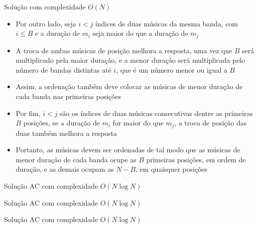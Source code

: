 \begin{frame}[fragile]{Solução com complexidade $O(N)$}

    \begin{itemize}
        \item Por outro lado, seja $i < j$ índices de duas músicas da mesma banda, com
            $i \leq B$ e a duração de $m_i$ seja maior do que a duração de $m_j$

        \item A troca de ambas músicas de posição melhora a resposta, uma vez que $B$ será
            multiplicado pela maior duração, e a menor duração será multiplicada pelo número de
            bandas distintas até $i$, que é um número menor ou igual a $B$

        \item Assim, a ordenação também deve colocar as músicas de menor duração de cada banda
            nas primeiras posições

        \item Por fim, $i < j$ são os índices de duas músicas consecutivas dentre as primeiras 
            $B$ posições, se a duração de $m_i$ for maior do que $m_j$, a troca de posição das
            duas também melhora a resposta

        \item Portanto, as músicas devem ser ordenadas de tal modo que as músicas de menor duração
            de cada banda ocupe as $B$ primeiras posições, em ordem de duração, e as demais
            ocupam as $N - B$, em quaisquer posições 
    \end{itemize}

\end{frame}

\begin{frame}[fragile]{Solução AC com complexidade $O(N\log N)$}
\end{frame}

\begin{frame}[fragile]{Solução AC com complexidade $O(N\log N)$}
\end{frame}

\begin{frame}[fragile]{Solução AC com complexidade $O(N\log N)$}
\end{frame}
